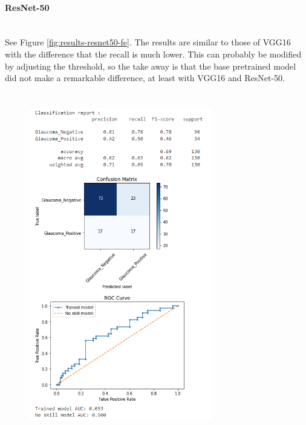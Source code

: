\documentclass[11pt, a4paper]{article}
\begin{document}
\paragraph{ResNet-50}\mbox{}\\
See Figure \ref{fig:results-resnet50-fe}. The results are similar to those of VGG16 with the difference that the recall is much lower. This can probably be modified by adjusting the threshold, so the take away is that the base pretrained model did not make a remarkable difference, at least with VGG16 and ResNet-50.
\begin{figure}[H]
\centering
\begin{minipage}{.5\textwidth}
  \centering
  \includegraphics[width=8cm, height=15cm]{imgs/results/results-vgg16-fe.PNG}
  \label{fig:results-vgg16-fe}
\end{minipage}%
\begin{minipage}{.5\textwidth}
  \centering

\end{minipage}
\end{figure}
\end{document}
